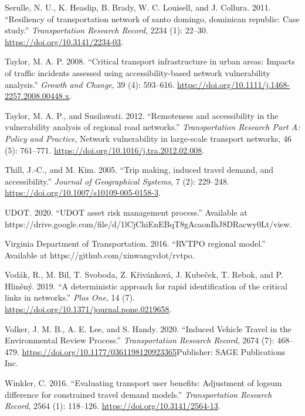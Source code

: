 \documentclass[]{ascelike-new}
\newlength{\cslhangindent}
\newenvironment{CSLReferences}[2] %
 {\begin{list}{}{%
  \setlength{\itemindent}{0pt}
  \setlength{\leftmargin}{0pt}
  \setlength{\parsep}{0pt}
  \ifodd #1
   \setlength{\leftmargin}{\cslhangindent}
   \setlength{\itemindent}{-1\cslhangindent}
  \fi
  \setlength{\itemsep}{#2\baselineskip}}}
 {\end{list}}
\begin{document}
\begin{CSLReferences}{1}{0}
Serulle, N. U., K. Heaslip, B. Brady, W. C. Louisell, and J. Collura.
2011. {``Resiliency of transportation network of santo domingo,
dominican republic: Case study.''} \emph{Transportation Research
Record}, 2234 (1): 22--30. \url{https://doi.org/10.3141/2234-03}.

Taylor, M. A. P. 2008. {``Critical transport infrastructure in urban
areas: Impacts of traffic incidents assessed using accessibility-based
network vulnerability analysis.''} \emph{Growth and Change}, 39 (4):
593--616. \url{https://doi.org/10.1111/j.1468-2257.2008.00448.x}.

Taylor, M. A. P., and Susilawati. 2012. {``Remoteness and accessibility
in the vulnerability analysis of regional road networks.''}
\emph{Transportation Research Part A: Policy and Practice}, Network
vulnerability in large-scale transport networks, 46 (5): 761--771.
\url{https://doi.org/10.1016/j.tra.2012.02.008}.

Thill, J.-C., and M. Kim. 2005. {``Trip making, induced travel demand,
and accessibility.''} \emph{Journal of Geographical Systems}, 7 (2):
229--248. \url{https://doi.org/10.1007/s10109-005-0158-3}.

UDOT. 2020. {``UDOT asset risk management process.''} Available at
https://drive.google.com/file/d/1lCjChiEnEBqT8gAcaonIhJ8DRacwy0Lt/view.

Virginia Department of Transportation. 2016. {``RVTPO regional model.''}
Available at https://github.com/xinwangvdot/rvtpo.

Vodák, R., M. Bíl, T. Svoboda, Z. Křivánková, J. Kubeček, T. Rebok, and
P. Hliněný. 2019. {``A deterministic approach for rapid identification
of the critical links in networks.''} \emph{Plos One}, 14 (7).
\url{https://doi.org/10.1371/journal.pone.0219658}.

Volker, J. M. B., A. E. Lee, and S. Handy. 2020. {``Induced Vehicle
Travel in the Environmental Review Process.''} \emph{Transportation
Research Record}, 2674 (7): 468--479.
\url{https://doi.org/10.1177/0361198120923365}Publisher: SAGE
Publications Inc.

Winkler, C. 2016. {``Evaluating transport user benefits: Adjustment of
logsum difference for constrained travel demand models.''}
\emph{Transportation Research Record}, 2564 (1): 118--126.
\url{https://doi.org/10.3141/2564-13}.


\end{CSLReferences}
\end{document}
